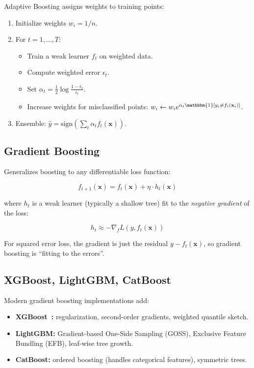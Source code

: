 Adaptive Boosting assigns weights to training points:
\begin{enumerate}
	\item Initialize weights $w_i = 1/n$.
	\item For $t = 1, \dots, T$:
	      \begin{itemize}
		      \item Train a weak learner $f_t$ on weighted data.
		      \item Compute weighted error $\epsilon_t$.
		      \item Set $\alpha_t = \frac12 \log\frac{1 - \epsilon_t}{\epsilon_t}$.
		      \item Increase weights for misclassified points: $w_i \gets w_i e^{\alpha_t \mathbbm{1}[y_i \neq f_t(\mathbf{x}_i)]}$.
	      \end{itemize}
	\item Ensemble: $\hat{y} = \text{sign}(\sum_t \alpha_t f_t(\mathbf{x}))$.
\end{enumerate}

\subsection{Gradient Boosting}

Generalizes boosting to any differentiable loss function:

\[
	f_{t+1}(\mathbf{x}) = f_t(\mathbf{x}) + \eta \cdot h_t(\mathbf{x})
\]

where $h_t$ is a weak learner (typically a shallow tree) fit to the \emph{negative gradient} of the loss:

\[
	h_t \approx -\nabla_{f} L(y, f_t(\mathbf{x}))
\]

For squared error loss, the gradient is just the residual $y - f_t(\mathbf{x})$, so gradient boosting is ``fitting to the errors''.

\subsection{XGBoost, LightGBM, CatBoost}

Modern gradient boosting implementations add:

\begin{itemize}
	\item \textbf{XGBoost~\cite{chen2016xgboost}:} regularization, second-order gradients, weighted quantile sketch.
	\item \textbf{LightGBM:} Gradient-based One-Side Sampling (GOSS), Exclusive Feature Bundling (EFB), leaf-wise tree growth.
	\item \textbf{CatBoost:} ordered boosting (handles categorical features), symmetric trees.
\end{itemize}

